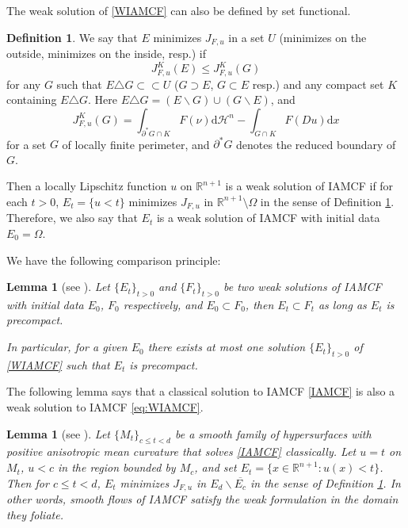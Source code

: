 \documentclass[11pt,reqno]{amsart}
\newtheorem{lemma}[proposition]{Lemma}
\theoremstyle{definition}
\newtheorem{definition}[proposition]{Definition}
\theoremstyle{remark}
\numberwithin{equation}{section}
\begin{document}
The weak solution of \eqref{WIAMCF} can also be defined by set functional.
\begin{definition}
\label{def-minimizes}
    We say that $E$ minimizes $J_{F,u}$ in a set $U$ (minimizes on the outside, minimizes on the inside, resp.) if
    \begin{equation*}
        J_{F,u}^K(E) \leq J_{F,u}^K(G)
    \end{equation*}
    for any $G$ such that $E\triangle G\subset\subset U$  ($G\supset E$, $G\subset E$ resp.) and any compact set $K$ containing $E\triangle G$. Here $E\triangle G = (E\backslash G)\cup(G\backslash E)$, and 
    \begin{equation*}
        J_{F,u}^K(G) = \int_{\partial^* G \cap K} F(\nu)\mathrm{d}\mathcal{H}^{n} - \int_{G\cap K} F(Du) \mathrm{d}x
    \end{equation*}
    for a set $G$ of locally finite perimeter, and $\partial^*G$ denotes the reduced boundary of $G$.
\end{definition}

Then a locally Lipschitz function $u$ on $\mathbb{R}^{n+1}$ is a weak solution of IAMCF if for each $t>0$, $E_t=\{u<t\}$ minimizes $J_{F,u}$ in $\mathbb{R}^{n+1}\setminus\Omega$ in the sense of Definition \ref{def-minimizes}. Therefore, we also say that $E_t$ is a weak solution of IAMCF with initial data $E_0=\Omega$. 

We have the following comparison principle:
\begin{lemma}[see {\cite[Proposition 3.3]{DGX23}}]
    \label{lem-weakcom}
    Let $\{E_t\}_{t>0}$ and $\{F_t\}_{t>0}$ be two weak solutions of IAMCF with initial data $E_0$, $F_0$ respectively, and $E_0\subset F_0$, then $E_t\subset F_t$ as long as $E_t$ is precompact.
    
    In particular, for a given $E_0$ there exists at most one solution $\{E_t\}_{t>0}$ of \eqref{WIAMCF} such that $E_t$ is precompact. 
\end{lemma}


The following lemma says that a classical solution to IAMCF \eqref{IAMCF} is also a weak solution to IAMCF \eqref{eq:WIAMCF}.
\begin{lemma}[see {\cite[Lemma 2.5]{GWZ26}}]
		\label{lem-smweak}
		Let $\{M_t\}_{c\leq t<d}$ be a smooth family of hypersurfaces with positive anisotropic mean curvature that solves \eqref{IAMCF} classically. Let $u=t$ on $M_t$, $u<c$ in the region bounded by $M_c$, and set $E_t=\{x\in\mathbb{R}^{n+1}:u(x)<t\}$. Then for $c\leq t<d$, $E_t$ minimizes $J_{F,u}$ in $E_d\backslash \overline{E_c}$ in the sense of Definition \ref{def-minimizes}. In other words, smooth flows of IAMCF satisfy the weak formulation in the domain they foliate.
	\end{lemma}
\end{document}
